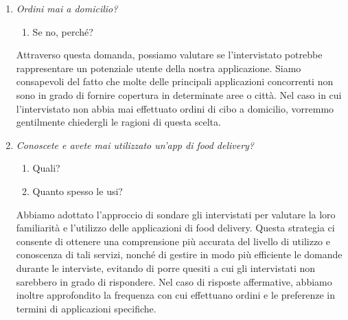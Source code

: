 \documentclass{article}
\begin{document}
    \begin{enumerate}
    
    \item \textit{Ordini mai a domicilio?}
        \begin{enumerate}
            \item Se no, perché?
        \end{enumerate}
        \begin{tcolorbox}[
            colframe=green,  %
            colback=white,  %
            sharp corners,  %
            boxrule=0.5pt,  %
            left=5pt,  %
            right=5pt,  %
            top=5pt,  %
            bottom=5pt  %
        ]
        Attraverso questa domanda, possiamo valutare se l'intervistato potrebbe rappresentare un potenziale utente della nostra applicazione. Siamo consapevoli del fatto che molte delle principali applicazioni concorrenti non sono in grado di fornire copertura in determinate aree o città. Nel caso in cui l'intervistato non abbia mai effettuato ordini di cibo a domicilio, vorremmo gentilmente chiedergli le ragioni di questa scelta.
        \end{tcolorbox}
    \newpage
    \item \textit{Conoscete e avete mai utilizzato un'app di food delivery?}
        \begin{enumerate}
            \item Quali?
            \item Quanto spesso le usi?
        \end{enumerate}
        \begin{tcolorbox}[
            colframe=green,  %
            colback=white,  %
            sharp corners,  %
            boxrule=0.5pt,  %
            left=5pt,  %
            right=5pt,  %
            top=5pt,  %
            bottom=5pt  %
        ]
        Abbiamo adottato l'approccio di sondare gli intervistati per valutare la loro familiarità e l'utilizzo delle applicazioni di food delivery. Questa strategia ci consente di ottenere una comprensione più accurata del livello di utilizzo e conoscenza di tali servizi, nonché di gestire in modo più efficiente le domande durante le interviste, evitando di porre quesiti a cui gli intervistati non sarebbero in grado di rispondere. Nel caso di risposte affermative, abbiamo inoltre approfondito la frequenza con cui effettuano ordini e le preferenze in termini di applicazioni specifiche.

\end{tcolorbox}
\end{enumerate}
\end{document}
